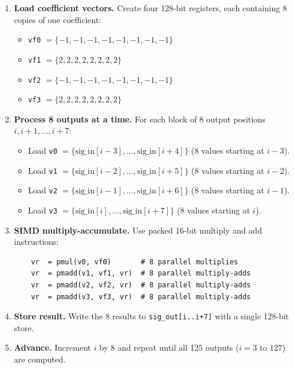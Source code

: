 \begin{enumerate}
  \item \textbf{Load coefficient vectors.} Create four 128-bit registers, each
        containing 8 copies of one coefficient:
        \begin{itemize}
          \item \texttt{vf0} $= \{-1, -1, -1, -1, -1, -1, -1, -1\}$
          \item \texttt{vf1} $= \{2, 2, 2, 2, 2, 2, 2, 2\}$
          \item \texttt{vf2} $= \{-1, -1, -1, -1, -1, -1, -1, -1\}$
          \item \texttt{vf3} $= \{2, 2, 2, 2, 2, 2, 2, 2\}$
        \end{itemize}

  \item \textbf{Process 8 outputs at a time.} For each block of 8 output
        positions $i, i+1, \ldots, i+7$:
        \begin{itemize}
          \item Load \texttt{v0} $= \{\text{sig\_in}[i-3], \ldots,
                \text{sig\_in}[i+4]\}$ (8 values starting at $i-3$).
          \item Load \texttt{v1} $= \{\text{sig\_in}[i-2], \ldots,
                \text{sig\_in}[i+5]\}$ (8 values starting at $i-2$).
          \item Load \texttt{v2} $= \{\text{sig\_in}[i-1], \ldots,
                \text{sig\_in}[i+6]\}$ (8 values starting at $i-1$).
          \item Load \texttt{v3} $= \{\text{sig\_in}[i], \ldots,
                \text{sig\_in}[i+7]\}$ (8 values starting at $i$).
        \end{itemize}

  \item \textbf{SIMD multiply-accumulate.} Use packed 16-bit multiply and add
        instructions:
\begin{verbatim}
    vr  = pmul(v0, vf0)       # 8 parallel multiplies
    vr  = pmadd(v1, vf1, vr)  # 8 parallel multiply-adds
    vr  = pmadd(v2, vf2, vr)  # 8 parallel multiply-adds
    vr  = pmadd(v3, vf3, vr)  # 8 parallel multiply-adds
\end{verbatim}

  \item \textbf{Store result.} Write the 8 results to
        \texttt{sig\_out[i..i+7]} with a single 128-bit store.

  \item \textbf{Advance.} Increment $i$ by 8 and repeat until all 125 outputs
        ($i = 3$ to $127$) are computed.
\end{enumerate}

